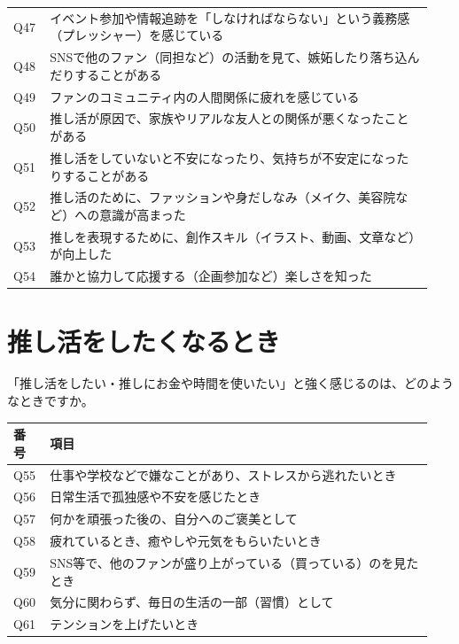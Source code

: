 \begin{longtable}{@{}p{0.08\linewidth}p{0.86\linewidth}@{}}
Q47 & イベント参加や情報追跡を「しなければならない」という義務感（プレッシャー）を感じている \\
Q48 & SNSで他のファン（同担など）の活動を見て、嫉妬したり落ち込んだりすることがある \\
Q49 & ファンのコミュニティ内の人間関係に疲れを感じている \\
Q50 & 推し活が原因で、家族やリアルな友人との関係が悪くなったことがある \\
Q51 & 推し活をしていないと不安になったり、気持ちが不安定になったりすることがある \\
Q52 & 推し活のために、ファッションや身だしなみ（メイク、美容院など）への意識が高まった \\
Q53 & 推しを表現するために、創作スキル（イラスト、動画、文章など）が向上した \\
Q54 & 誰かと協力して応援する（企画参加など）楽しさを知った \\
\end{longtable}
\section*{推し活をしたくなるとき}
\noindent 「推し活をしたい・推しにお金や時間を使いたい」と強く感じるのは、どのようなときですか。\\
\begin{longtable}{@{}p{0.08\linewidth}p{0.86\linewidth}@{}}
\toprule 番号 & 項目 \\ \midrule \endhead \bottomrule \endfoot
Q55 & 仕事や学校などで嫌なことがあり、ストレスから逃れたいとき \\
Q56 & 日常生活で孤独感や不安を感じたとき \\
Q57 & 何かを頑張った後の、自分へのご褒美として \\
Q58 & 疲れているとき、癒やしや元気をもらいたいとき \\
Q59 & SNS等で、他のファンが盛り上がっている（買っている）のを見たとき \\
Q60 & 気分に関わらず、毎日の生活の一部（習慣）として \\
Q61 & テンションを上げたいとき \\
\end{longtable}
